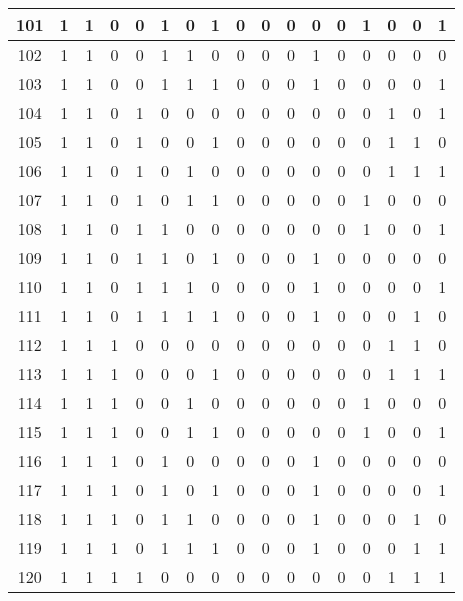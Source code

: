 \documentclass[12pt, oneside, openany]{article}
\begin{document}
{\begin{longtable}[c]{|c||c|c|c|c|c|c|c||c|c|c|c|c|c|c|c|c|}
    \hline
    101 & 1 &  1 & 0 & 0 & 1 & 0 & 1 &  0 & 0 & 0 & 0 &  0 &  1 & 0 & 0 & 1 \\
    \hline
    102 & 1 &  1 & 0 & 0 & 1 & 1 & 0 &  0 & 0 & 0 & 1 &  0 &  0 & 0 & 0 & 0 \\
    \hline
    103 & 1 &  1 & 0 & 0 & 1 & 1 & 1 &  0 & 0 & 0 & 1 &  0 &  0 & 0 & 0 & 1 \\
    \hline
    104 & 1 &  1 & 0 & 1 & 0 & 0 & 0 &  0 & 0 & 0 & 0 &  0 &  0 & 1 & 0 & 1 \\
    \hline
    105 & 1 &  1 & 0 & 1 & 0 & 0 & 1 &  0 & 0 & 0 & 0 &  0 &  0 & 1 & 1 & 0 \\
    \hline
    106 & 1 &  1 & 0 & 1 & 0 & 1 & 0 &  0 & 0 & 0 & 0 &  0 &  0 & 1 & 1 & 1 \\
    \hline
    107 & 1 &  1 & 0 & 1 & 0 & 1 & 1 &  0 & 0 & 0 & 0 &  0 &  1 & 0 & 0 & 0 \\
    \hline
    108 & 1 &  1 & 0 & 1 & 1 & 0 & 0 &  0 & 0 & 0 & 0 &  0 &  1 & 0 & 0 & 1 \\
    \hline
    109 & 1 &  1 & 0 & 1 & 1 & 0 & 1 &  0 & 0 & 0 & 1 &  0 &  0 & 0 & 0 & 0 \\
    \hline
    110 & 1 &  1 & 0 & 1 & 1 & 1 & 0 &  0 & 0 & 0 & 1 &  0 &  0 & 0 & 0 & 1 \\
    \hline
    111 & 1 &  1 & 0 & 1 & 1 & 1 & 1 &  0 & 0 & 0 & 1 &  0 &  0 & 0 & 1 & 0 \\
    \hline
    112 & 1 &  1 & 1 & 0 & 0 & 0 & 0 &  0 & 0 & 0 & 0 &  0 &  0 & 1 & 1 & 0 \\
    \hline
    113 & 1 &  1 & 1 & 0 & 0 & 0 & 1 &  0 & 0 & 0 & 0 &  0 &  0 & 1 & 1 & 1 \\
    \hline
    114 & 1 &  1 & 1 & 0 & 0 & 1 & 0 &  0 & 0 & 0 & 0 &  0 &  1 & 0 & 0 & 0 \\
    \hline
    115 & 1 &  1 & 1 & 0 & 0 & 1 & 1 &  0 & 0 & 0 & 0 &  0 &  1 & 0 & 0 & 1 \\
    \hline
    116 & 1 &  1 & 1 & 0 & 1 & 0 & 0 &  0 & 0 & 0 & 1 &  0 &  0 & 0 & 0 & 0 \\
    \hline
    117 & 1 &  1 & 1 & 0 & 1 & 0 & 1 &  0 & 0 & 0 & 1 &  0 &  0 & 0 & 0 & 1 \\
    \hline
    118 & 1 &  1 & 1 & 0 & 1 & 1 & 0 &  0 & 0 & 0 & 1 &  0 &  0 & 0 & 1 & 0 \\
    \hline
    119 & 1 &  1 & 1 & 0 & 1 & 1 & 1 &  0 & 0 & 0 & 1 &  0 &  0 & 0 & 1 & 1 \\
    \hline
    120 & 1 &  1 & 1 & 1 & 0 & 0 & 0 &  0 & 0 & 0 & 0 &  0 &  0 & 1 & 1 & 1 \\

\end{longtable}}
\end{document}

